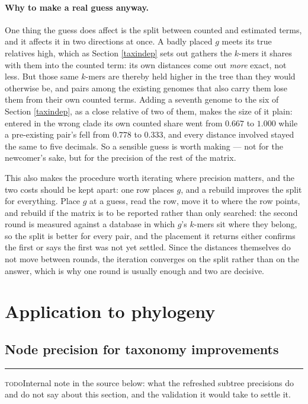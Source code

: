 \documentclass[pdflatex,sn-vancouver-num]{sn-jnl}
\newif\ifshowtodos \showtodostrue
\newcommand{\todo}[1]{%
  \ifshowtodos
    \par\addvspace{0.7\baselineskip}%
    \begin{list}{}{%
      \setlength{\leftmargin}{1.5em}%
      \setlength{\rightmargin}{1.5em}%
      \setlength{\topsep}{0pt}%
      \setlength{\partopsep}{0pt}%
      \setlength{\parsep}{0.5\baselineskip}%
      \setlength{\itemsep}{0pt}%
    }%
    \item[]\footnotesize\color{black!70}%
      \textcolor{orange!65!black}{\rule[-0.2ex]{2pt}{1.15ex}}\hspace{0.55em}%
      \textcolor{orange!65!black}{\textsc{todo}}\hspace{0.6em}\ignorespaces#1%
    \end{list}%
    \addvspace{0.7\baselineskip}%
  \fi%
}
\begin{document}
\paragraph{Why to make a real guess anyway.} One thing the guess does affect is the split between
counted and estimated terms, and it affects it in two directions at once. A badly placed $g$ meets its
true relatives high, which as Section \ref{taxindep} sets out gathers the $k$-mers it shares with
them into the counted term: its own distances come out \emph{more} exact, not less. But those same
$k$-mers are thereby held higher in the tree than they would otherwise be, and pairs among the
existing genomes that also carry them lose them from their own counted terms. Adding a seventh
genome to the six of Section \ref{taxindep}, as a close relative of two of them, makes the size of it
plain: entered in the wrong clade its own counted share went from $0.667$ to $1.000$ while a
pre-existing pair's fell from $0.778$ to $0.333$, and every distance involved stayed the same to five
decimals. So a sensible guess is worth making --- not for the
newcomer's sake, but for the precision of the rest of the matrix.

This also makes the procedure worth iterating where precision matters, and the two costs should be
kept apart: one row places $g$, and a rebuild improves the split for everything. Place $g$ at a guess,
read the row, move it to where the row points, and rebuild if the matrix is to be reported rather than
only searched: the second round is measured against a database in which $g$'s $k$-mers sit where they
belong, so the split is better for every pair, and the placement it returns either confirms the first
or says the first was not yet settled. Since the
distances themselves do not move between rounds, the iteration converges on the split rather than on
the answer, which is why one round is usually enough and two are decisive.

   \section{Application to phylogeny}

    \subsection{Node precision for taxonomy improvements}\label{nodeprec}

\todo{Internal note in the source below: what the refreshed subtree precisions do and do not say about this section, and the validation it would take to settle it.}
\end{document}
